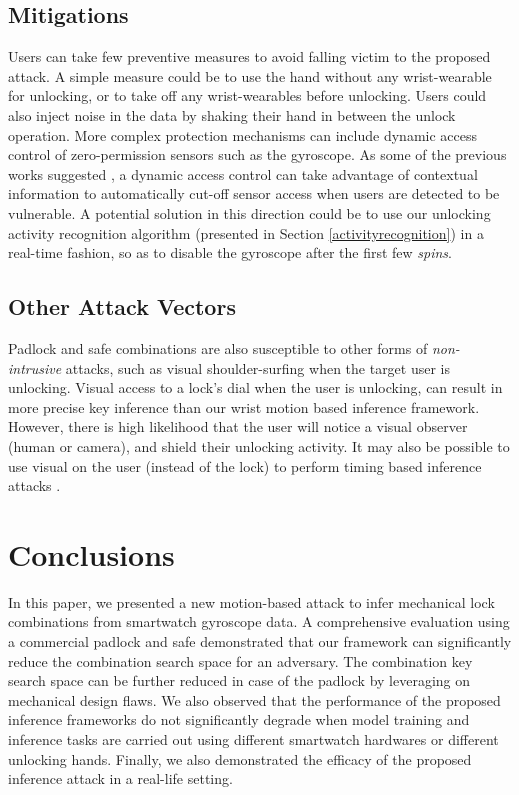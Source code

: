 \documentclass[]{IEEEtran}
\begin{document}
\subsection{Mitigations}
Users can take few preventive measures to avoid falling victim to the proposed attack. A simple measure could be to use the hand without any wrist-wearable for unlocking, or to take off any wrist-wearables before unlocking. Users could also inject noise in the data by shaking their hand in between the unlock operation. More complex protection mechanisms can include dynamic access control of zero-permission sensors such as the gyroscope. As some of the previous works suggested \cite{cappos2014blursense,maiti2016smartwatch}, a dynamic access control can take advantage of contextual information to automatically cut-off sensor access when users are detected to be vulnerable. A potential solution in this direction could be to use our unlocking activity recognition algorithm (presented in Section \ref{activityrecognition}) in a real-time fashion, so as to disable the gyroscope after the first few \textit{spins}.

\subsection{Other Attack Vectors}
Padlock and safe combinations are also susceptible to other forms of \emph{non-intrusive} attacks, such as visual shoulder-surfing when the target user is unlocking. Visual access to a lock's dial when the user is unlocking, can result in more precise key inference than our wrist motion based inference framework. However, there is high likelihood that the user will notice a visual observer (human or camera), and shield their unlocking activity. It may also be possible to use visual on the user (instead of the lock) to perform timing based inference attacks \cite{foo2010timing}.


\section{Conclusions}
\label{conclusion}

In this paper, we presented a new motion-based attack to infer mechanical lock combinations from smartwatch gyroscope data. A comprehensive evaluation using a commercial padlock and safe demonstrated that our framework can significantly reduce the combination search space for an adversary. The combination key search space can be further reduced in case of the padlock by leveraging on mechanical design flaws. We also observed that the performance of the proposed inference frameworks do not significantly degrade when model training and inference tasks are carried out using different smartwatch hardwares or different unlocking hands. Finally, we also demonstrated the efficacy of the proposed inference attack in a real-life setting.
\end{document}
